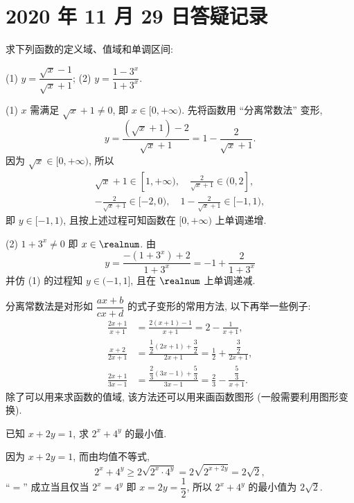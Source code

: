 \section{2020 年 11 月 29 日答疑记录}

\begin{example}
    求下列函数的定义域、值域和单调区间:
    
    (1) $y=\dfrac{\sqrt{x}-1}{\sqrt{x}+1}$;\qquad
    (2) $y=\dfrac{1-3^x}{1+3^x}$.
\end{example}
\begin{solution}
    (1) $x$ 需满足 $\sqrt{x}+1\neq 0$, 即 $x\in[0,+\infty)$. 先将函数用 ``分离常数法'' 变形,
    \[y=\frac{(\sqrt{x}+1)-2}{\sqrt{x}+1}
        = 1-\frac{2}{\sqrt{x}+1}.\]
    因为 $\sqrt{x}\in[0,+\infty)$, 所以 
    \[\begin{gathered}
        \sqrt{x}+1\in[1,+\infty),\quad 
            \frac2{\sqrt{x}+1}\in(0,2],\\
        -\frac2{\sqrt{x}+1}\in[-2,0),\quad
        1-\frac2{\sqrt{x}+1}\in[-1,1),
    \end{gathered}\]
    即 $y\in[-1,1)$, 且按上述过程可知函数在 $[0,+\infty)$ 上单调递增.
    
    (2) $1+3^x\neq0$ 即 $x\in\realnum$. 由 
    \[y= \frac{-(1+3^x)+2}{1+3^x}= -1+\frac2{1+3^x}\]
    并仿 (1) 的过程知 $y\in(-1,1]$, 且在 $\realnum$ 上单调递减.
\end{solution}

分离常数法是对形如 $\dfrac{ax+b}{cx+d}$ 的式子变形的常用方法, 以下再举一些例子:
\[\begin{aligned}
    \frac{2x+1}{x+1}&= \frac{2(x+1)-1}{x+1}= 2-\frac1{x+1},\\
    \frac{x+2}{2x+1}&= \frac{\dfrac12(2x+1)+\dfrac32}{2x+1}= \frac12+\frac{\dfrac32}{2x+1},\\
    \frac{2x+1}{3x-1}&= \frac{\dfrac23(3x-1)+\dfrac53}{3x-1}= \frac23-\frac{\dfrac53}{x+1}.
\end{aligned}\]
除了可以用来求函数的值域, 该方法还可以用来画函数图形 (一般需要利用图形变换).

\begin{example}
    已知 $x+2y=1$, 求 $2^x+4^y$ 的最小值.
\end{example}
\begin{solution}
    因为 $x+2y=1$, 而由均值不等式,
    \[2^x+4^y\geqslant 2\sqrt{2^x\cdot 4^y}
        = 2\sqrt{2^{x+2y}}= 2\sqrt2,\]
    ``$=$'' 成立当且仅当 $2^x=4^y$ 即 $x=2y=\dfrac12$, 所以 $2^x+4^y$ 的最小值为 $2\sqrt2$.
\end{solution}

